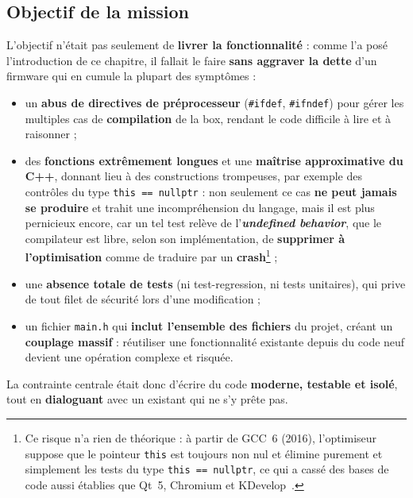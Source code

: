 \subsection{Objectif de la mission}
L'objectif n'était pas seulement de \textbf{livrer la fonctionnalité} : comme
l'a posé l'introduction de ce chapitre, il fallait le faire \textbf{sans
aggraver la dette} d'un firmware qui en cumule la plupart des symptômes :
\begin{itemize}
  \item un \textbf{abus de directives de préprocesseur} (\texttt{\#ifdef},
        \texttt{\#ifndef}) pour gérer les multiples cas de \textbf{compilation}
        de la box, rendant le code difficile à lire et à raisonner ;
  \item des \textbf{fonctions extrêmement longues} et une \textbf{maîtrise
        approximative du C++}, donnant lieu à des constructions trompeuses,
        par exemple des contrôles du type \texttt{this == nullptr} : non
        seulement ce cas \textbf{ne peut jamais se produire} et trahit une
        incompréhension du langage, mais il est plus pernicieux encore, car un
        tel test relève de l'\textbf{\emph{undefined behavior}}, que le
        compilateur est libre, selon son implémentation, de
        \textbf{supprimer à l'optimisation} comme de traduire par un
        \textbf{crash}\footnote{Ce risque n'a rien de théorique : à partir de
        GCC~6 (2016), l'optimiseur suppose que le pointeur \texttt{this} est
        toujours non nul et élimine purement et simplement les tests du type
        \texttt{this == nullptr}, ce qui a cassé des bases de code aussi
        établies que Qt~5, Chromium et KDevelop~\cite{gcc6porting}.} ;
  \item une \textbf{absence totale de tests} (ni \gls{test-regression}, ni
        tests unitaires), qui prive de tout filet de sécurité lors d'une
        modification ;
  \item un fichier \texttt{main.h} qui \textbf{inclut l'ensemble des fichiers}
        du projet, créant un \textbf{couplage massif} : réutiliser une
        fonctionnalité existante depuis du code neuf devient une opération
        complexe et risquée.
\end{itemize}
La contrainte centrale était donc d'écrire du code \textbf{moderne, testable
et isolé}, tout en \textbf{dialoguant} avec un existant qui ne s'y prête pas.

